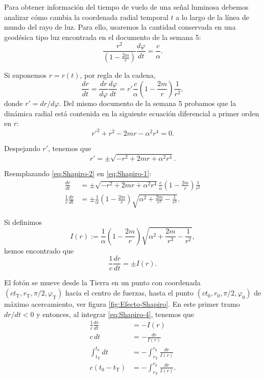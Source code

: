 \documentclass[letterpaper,11pt]{article}
\begin{document}
Para obtener información del tiempo de vuelo de una señal luminosa debemos analizar cómo cambia la coordenada radial temporal $t$ a lo largo de la línea de mundo del rayo de luz. Para ello, usaremos la cantidad conservada en una geodésica tipo luz encontrada en el documento de la semana 5:
\begin{equation}
\frac{r^2}{\left(1 - \frac{2m}{r} \right)} \frac{d\varphi}{dt} = \frac{c}{\alpha}.
\end{equation}

Si suponemos $r = r(t)$, por regla de la cadena,
\begin{equation}
\frac{dr}{dt} = \frac{dr}{d\varphi} \frac{d\varphi}{dt} = r' \frac{c}{\alpha} \left( 1 - \frac{2m}{r}\right) \frac{1}{r^2}, \label{eq:Shapiro-1}
\end{equation}
donde $r' = dr/d\varphi$. Del mismo documento de la semana 5 probamos que la dinámica radial está contenida en la siguiente ecuación diferencial a primer orden en $r$:
\begin{equation}
r'^2 + r^2 -2mr -\alpha^2 r^4 = 0. \label{eq:Shapiro-1.5}
\end{equation}

Despejando $r'$, tenemos que
\begin{equation}
r' = \pm \sqrt{-r^2 + 2mr + \alpha^2r^4}. \label{eq:Shapiro-2}
\end{equation}

Reemplazando \eqref{eq:Shapiro-2} en \eqref{eq:Shapiro-1}:
\begin{align}
\frac{dr}{dt} &= \pm \sqrt{-r^2 + 2mr + \alpha^2r^4} \frac{c}{\alpha} \left(1 - \frac{2m}{r} \right) \frac{1}{r^2} \\
\frac{1}{c} \frac{dr}{dt} &= \pm \frac{1}{\alpha} \left( 1 - \frac{2m}{r}\right)\sqrt{\alpha^2 + \frac{2m}{r^3} - \frac{1}{r^2}}.
\end{align}

Si definimos
\begin{equation}
I(r) := \frac{1}{\alpha} \left(1 - \frac{2m}{r} \right) \sqrt{\alpha^2 + \frac{2m}{r^3} - \frac{1}{r^2}}, \label{eq:Shapiro-3}
\end{equation}
hemos encontrado que
\begin{equation}
\frac{1}{c} \frac{dr}{dt} = \pm I(r).\label{eq:Shapiro-4}
\end{equation}

El fotón se mueve desde la Tierra en un punto con coordenada $(ct_{\text{T}},r_{\text{T}},\pi/2,\varphi_{\text{T}})$ hacia el centro de fuerzas, hasta el punto $(ct_0,r_0,\pi/2,\varphi_0)$ de máximo acercamiento, ver figura \ref{fig:Efecto-Shapiro}. En este primer tramo $dr/dt < 0$ y entonces, al integrar \eqref{eq:Shapiro-4}, tenemos que
\begin{align}
\frac{1}{c} \frac{dr}{dt} &= -I(r) \\
c\,dt &= -\frac{dr}{I(r)} \\
\int_{t_{\text{T}}}^{t_0} dt &= - \int_{r_{\text{T}}}^{r_0} \frac{dr}{I(r)} \\
c(t_0 - t_{\text{T}}) &= - \int_{r_{\text{T}}}^{r_0} \frac{dr}{I(r)}. \label{eq:Shapiro-5}
\end{align}
\end{document}
